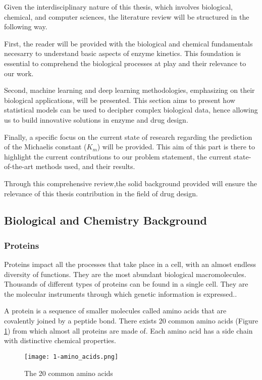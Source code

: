 Given the interdisciplinary nature of this thesis, which involves biological, chemical, and 
computer sciences, the literature review will be structured in the following way.

First, the reader will be provided with the biological and chemical fundamentals necesarry to understand basic aspects
of enzyme kinetics. This foundation is essential to comprehend the biological processes at play and
their relevance to our work.

Second, machine learning and deep learning methodologies, emphasizing on their biological
applications, will be presented. This section aims to present how statistical models can be used to decipher complex biological
data, hence allowing us to build innovative solutions in enzyme and drug design.

Finally, a specific focus on the current state of research regarding the prediction of the Michaelis 
constant ($K_m$) will be provided. This aim of this part is there to highlight the current contributions to 
our problem statement, the current state-of-the-art methods used, and their results.

Through this comprehensive review,the solid background provided will ensure the relevance of this thesis
contribution in the field of drug design. 

\subsection{Biological and Chemistry Background}
\subsubsection{Proteins}
Proteins impact all the processes that take place in a cell, with an almost
endless diversity of functions. They are the most abundant biological macromolecules.
Thousands of different types of proteins can be found in a single cell. They are the molecular
instruments through which genetic information is expressed.\cite{lehninger}.

A protein is a sequence of smaller molecules called amino acids that are covalently joined by a peptide
bond. There exists 20 common amino acids (Figure \ref{fig:20aa}) from which almost all proteins are made of. Each amino acid has
a side chain with distinctive chemical properties.

\begin{figure}
  \centering
  \texttt{[image: 1-amino\_acids.png]}
  \caption{The 20 common amino acids}
  \label{fig:20aa}
\end{figure}

